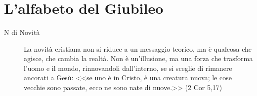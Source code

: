 \section{L'alfabeto del Giubileo}

\paragraph{}
\vspace*{-\parskip}

\begin{description}

  \item[N di Novità] La novità cristiana non si riduce a un messaggio teorico, ma è qualcosa che agisce, che cambia la realtà. Non è un'illusione, ma una forza che trasforma l'uomo e il mondo, rinnovandoli dall'interno, se si sceglie di rimanere ancorati a Gesù: <<se uno è in Cristo, è una creatura nuova; le cose vecchie sono passate, ecco ne sono nate di nuove.>> (2 Cor 5,17)
\end{description}

